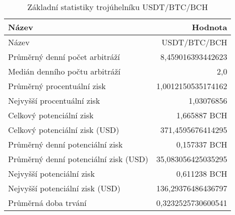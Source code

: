 \begin{table}\centering
\caption{Základní statistiky trojúhelníku USDT/BTC/BCH}
\label{USDTBTCBCH_stats}
\begin{tabular}{|| l | r ||}
\hline Název & Hodnota \\ 
\hline\hline Název & USDT/BTC/BCH \\ 
\hline Průměrný denní počet arbitráží & 8,459016393442623 \\ 
\hline Medián denního počtu arbitráží & 2,0 \\ 
\hline Průměrný procentuální zisk & 1,0012150535174162 \\ 
\hline Nejvyšší procentuální zisk & 1,03076856 \\ 
\hline Celkový potenciální zisk & 1,665887 BCH \\ 
\hline Celkový potenciální zisk (USD) & 371,4595676414295 \\ 
\hline Průměrný denní potenciální zisk & 0,157337 BCH \\ 
\hline Průměrný denní potenciální zisk (USD) & 35,083056425035295 \\ 
\hline Nejvyšší potenciální zisk & 0,611238 BCH \\ 
\hline Nejvyšší potenciální zisk (USD) & 136,29376486436797 \\ 
\hline Průměrná doba trvání & 0,3232525730600541 \\ 
\hline
\end{tabular}
\end{table}